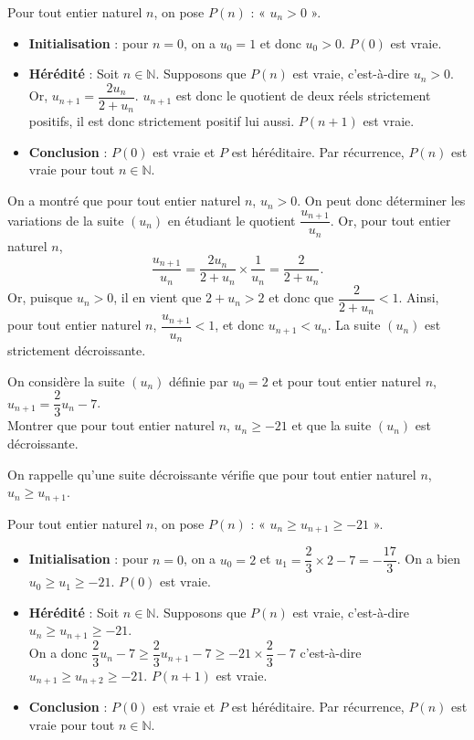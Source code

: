\documentclass[11pt,fleqn]{book} %
\begin{document}
\begin{solution}Pour tout entier naturel \(n\), on pose \(P(n)\) : « \(u_n > 0\) ».

\begin{itemize}\item \textbf{Initialisation} : pour \(n=0\), on a \(u_0=1\) et donc \(u_0 > 0\). \(P(0)\) est vraie.
\item \textbf{Hérédité} : Soit \(n\in\mathbb{N}\). Supposons que \(P(n)\) est vraie, c'est-à-dire \(u_n > 0\). Or, \(u_{n+1}=\dfrac{2u_n}{2+u_n}\). \(u_{n+1}\) est donc le quotient de deux réels strictement positifs, il est donc strictement positif lui aussi. \(P(n+1)\) est vraie.
\item \textbf{Conclusion} : \(P(0)\) est vraie et \(P\) est héréditaire. Par récurrence, \(P(n)\) est vraie pour tout \(n\in\mathbb{N}\).
\end{itemize}
 On a montré que pour tout entier naturel \(n\), \(u_n > 0\). On peut donc déterminer les variations de la suite \((u_n)\) en étudiant le quotient \(\dfrac{u_{n+1}}{u_n}\). Or, pour tout entier naturel \(n\), 
\[\dfrac{u_{n+1}}{u_n} = \dfrac{2u_n}{2+u_n} \times \dfrac{1}{u_n} = \dfrac{2}{2+u_n}.\]
Or, puisque \(u_n > 0\), il en vient que \( 2+u_n > 2\) et donc que \( \dfrac{2}{2+u_n} < 1\). Ainsi, pour tout entier naturel \(n\), \(\dfrac{u_{n+1}}{u_n} < 1\), et donc \(u_{n+1} < u_n\). La suite \((u_n)\) est strictement décroissante.\end{solution}

\begin{exercise}[topic=rec03]On considère la suite $(u_n)$ définie par $u_0=2$ et pour tout entier naturel $n$, $u_{n+1}=\dfrac{2}{3}u_n-7$. \\Montrer que pour tout entier naturel $n$, $u_n\geqslant -21$ et que la suite $(u_n)$ est décroissante.\end{exercise}


\begin{solution}
On rappelle qu'une suite décroissante vérifie que pour tout entier naturel $n$, $u_n \geqslant u_{n+1}$.

Pour tout entier naturel $n$, on pose $P(n)$ : « $u_n \geqslant u_{n+1} \geqslant -21$ ».

\begin{itemize}
\item \textbf{Initialisation} : pour $n=0$, on a $u_0=2$ et $u_1=\dfrac{2}{3}\times 2-7=-\dfrac{17}{3}$. On a bien  $u_0 \geqslant u_{1} \geqslant -21$. $P(0)$ est vraie.
\item \textbf{Hérédité} : Soit $n\in\mathbb{N}$. Supposons que $P(n)$ est vraie, c'est-à-dire $u_n \geqslant u_{n+1} \geqslant -21$.\\ On a donc $\dfrac{2}{3}u_n-7 \geqslant \dfrac{2}{3}u_{n+1}-7 \geqslant -21 \times \dfrac{2}{3} - 7$ c'est-à-dire $u_{n+1} \geqslant u_{n+2} \geqslant -21$. $P(n+1)$ est vraie.
\item \textbf{Conclusion} : $P(0)$ est vraie et $P$ est héréditaire. Par récurrence, $P(n)$ est vraie pour tout $n\in\mathbb{N}$.
\end{itemize}\end{solution}
\end{document}
